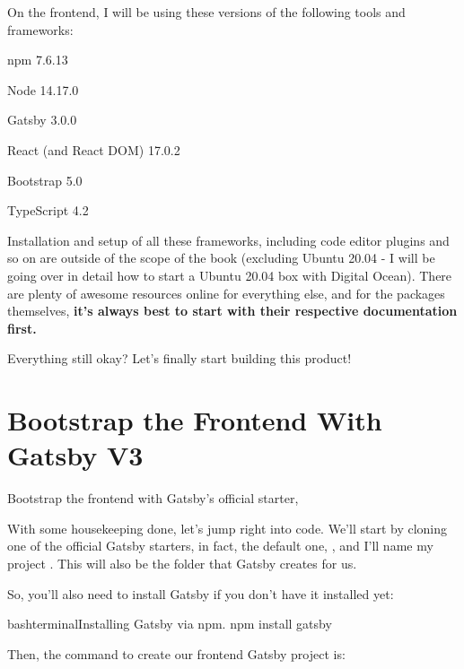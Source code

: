\documentclass[a4paper,headinclude=on,footinclude=on,12pt,oneside]{scrbook}
\begin{document}

On the frontend, I will be using these versions of the following tools and frameworks:

\begin{arrows}
\item npm 7.6.13
\item Node 14.17.0
\item Gatsby 3.0.0
\item React (and React DOM) 17.0.2
\item Bootstrap 5.0
\item TypeScript 4.2
\end{arrows}

Installation and setup of all these frameworks, including code editor plugins and so on are outside of the scope of the book (excluding Ubuntu 20.04 - I will be going over in detail how to start a Ubuntu 20.04 box with Digital Ocean). There are plenty of awesome resources online for everything else, and for the packages themselves, \textbf{it's always best to start with their respective documentation first.}

Everything still okay? Let's finally start building this product!

\section{Bootstrap the Frontend With Gatsby V3}
\begin{arrows}
\item Bootstrap the frontend with Gatsby's official starter, 
\end{arrows}

With some housekeeping done, let's jump right into code. We'll start by cloning one of the official Gatsby starters, in fact, the default one, , and I'll name my project . This will also be the folder that Gatsby creates for us. 

So, you'll also need to install Gatsby if you don't have it installed yet:

\begin{codeInput}{bash}{terminal}{Installing Gatsby via npm.}
npm install gatsby
\end{codeInput}

Then, the command to create our frontend Gatsby project is:
\end{document}
